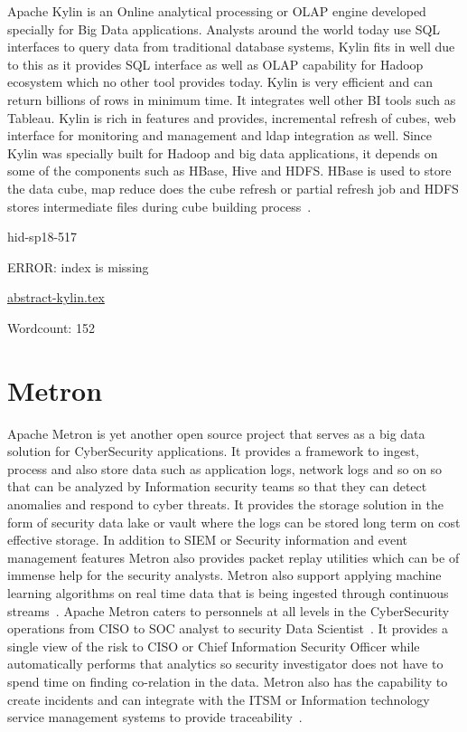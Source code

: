 Apache Kylin is an Online analytical processing or OLAP engine developed 
specially for Big Data applications. Analysts around the world today 
use SQL interfaces to query data from traditional database systems, 
Kylin fits in well due to this as it provides SQL interface as well 
as OLAP capability for Hadoop ecosystem which no other tool provides 
today. Kylin is very efficient and can return billions of rows in 
minimum time. It integrates well other BI tools such as Tableau. 
Kylin is rich in features and provides, incremental refresh of cubes, 
web interface for monitoring and management and ldap integration as 
well. Since Kylin was specially built for Hadoop and big data 
applications, it depends on some of the components such as HBase, 
Hive and HDFS. HBase is used to store the data cube, map reduce does 
the cube refresh or partial refresh job and HDFS stores intermediate 
files during cube building process~\cite{hid-sp18-517-ApacheKylin}.



\begin{IU}

hid-sp18-517

ERROR: index is missing

\href{https://github.com/cloudmesh-community/hid-sp18-517/blob/master//technology/abstract-kylin.tex}{abstract-kylin.tex}

 

Wordcount: 152

\end{IU}

\section{Metron}

Apache Metron is yet another open source project that serves as a 
big data solution for CyberSecurity applications. It provides a 
framework to ingest, process and also store data such as application 
logs, network logs and so on so that can be analyzed by Information 
security teams so that they can detect anomalies and respond to 
cyber threats. It provides the storage solution in the form of 
security data lake or vault where the logs can be stored long term on 
cost effective storage. In addition to SIEM or Security information 
and event management features Metron also provides packet replay 
utilities which can be of immense help for the security analysts. 
Metron also support applying machine learning algorithms on real time 
data that is being ingested through continuous streams~\cite{hid-sp18-517-metron-apache}. 
Apache Metron caters to personnels at all levels in the CyberSecurity 
operations from CISO to SOC analyst to security Data Scientist~\cite{hid-sp18-517-metron-hortonworks}.
It provides a single view of the risk to CISO or Chief Information 
Security Officer while automatically performs that analytics so 
security investigator does not have to spend time on finding co-relation
in the data. Metron also has the capability to create incidents and
can integrate with the ITSM or Information technology service management
systems to provide traceability~\cite{hid-sp18-517-metron-hortonworks}.


